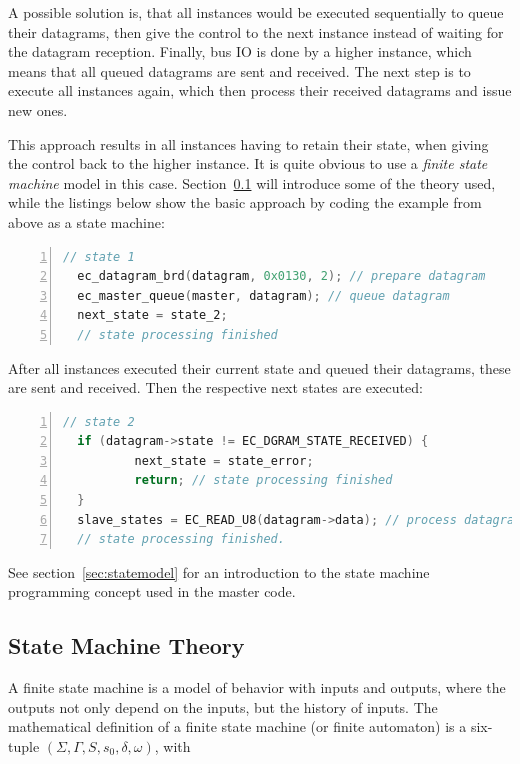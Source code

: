 \documentclass[a4paper,12pt,BCOR6mm,bibtotoc,idxtotoc]{scrbook}
\begin{document}
A possible solution is, that all instances would be executed
sequentially to queue their datagrams, then give the control to the
next instance instead of waiting for the datagram reception. Finally,
bus IO is done by a higher instance, which means that all queued
datagrams are sent and received. The next step is to execute all
instances again, which then process their received datagrams and issue
new ones.

This approach results in all instances having to retain their state,
when giving the control back to the higher instance. It is quite
obvious to use a \textit{finite state machine} model in this case.
Section~\ref{sec:fsmtheory} will introduce some of the theory used,
while the listings below show the basic approach by coding the example
from above as a state machine:

\begin{lstlisting}[language=C,numbers=left]
  // state 1
  ec_datagram_brd(datagram, 0x0130, 2); // prepare datagram
  ec_master_queue(master, datagram); // queue datagram
  next_state = state_2;
  // state processing finished
\end{lstlisting}

After all instances executed their current state and queued their
datagrams, these are sent and received. Then the respective next
states are executed:

\begin{lstlisting}[language=C,numbers=left]
  // state 2
  if (datagram->state != EC_DGRAM_STATE_RECEIVED) {
          next_state = state_error;
          return; // state processing finished
  }
  slave_states = EC_READ_U8(datagram->data); // process datagram
  // state processing finished.
\end{lstlisting}

See section~\ref{sec:statemodel} for an introduction to the
state machine programming concept used in the master code.


\subsection{State Machine Theory}
\label{sec:fsmtheory}

A finite state machine \cite{automata} is a model of behavior with
inputs and outputs, where the outputs not only depend on the inputs,
but the history of inputs. The mathematical definition of a finite
state machine (or finite automaton) is a six-tuple $(\Sigma, \Gamma,
S, s_0, \delta, \omega)$, with
\end{document}
